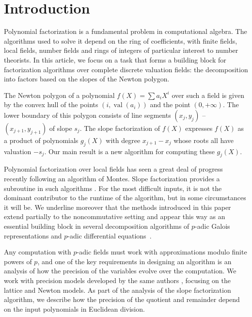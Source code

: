 \documentclass{sig-alternate-05-2015}
\DeclareMathOperator{\val}{val}
\begin{document}
\section{Introduction}

Polynomial factorization is a fundamental problem in computational algebra.
The algorithms used to solve it depend on the ring of coefficients, with finite fields,
local fields, number fields and rings of integers of particular interest to number theorists.
In this article, we focus on a task that forms a building block for factorization
algorithms over complete discrete valuation fields: the decomposition into factors based on the
slopes of the Newton polygon.

The Newton polygon of a polynomial $f(X) = \sum a_i X^i$ over such a field is given by
the convex hull of the points $(i, \val(a_i))$ and the point $(0, +\infty)$.  The lower
boundary of this polygon consists of line segments $(x_j,y_j)$ -- $(x_{j+1},y_{j+1})$
of slope $s_j$.  The slope factorization of $f(X)$ expresses $f(X)$ as a product
of polynomials $g_j(X)$ with degree $x_{j+1} - x_j$ whose roots all have valuation $-s_j$.
Our main result is a new algorithm for computing these $g_j(X)$.

Polynomial factorization over local fields has seen a great deal of progress recently
following an algorithm of Montes.  Slope factorization provides a subroutine
in such algorithms \cite[Section~2]{pauli:10a}.  For the most difficult inputs, it is not the dominant
contributor to the runtime of the algorithm, but in some circumstances it will be.
We underline moreover that the methods introduced in this paper extend 
partially to the noncommutative setting and appear this way as an
essential building block in several decomposition algorithms of 
$p$-adic Galois representations and $p$-adic differential 
equations~\cite{caruso:16}.

Any computation with $p$-adic fields must work with approximations modulo finite
powers of $p$, and one of the key requirements in designing an algorithm is
an analysis of how the precision of the variables evolve over the computation.
We work with precision models developed by the same authors
\cite[Section~4.2]{caruso-roe-vaccon:14a}, focusing on the lattice and Newton models.
As part of the analysis of the slope factorization algorithm, we describe
how the precision of the quotient and remainder depend on the input polynomials
in Euclidean division.
\end{document}
